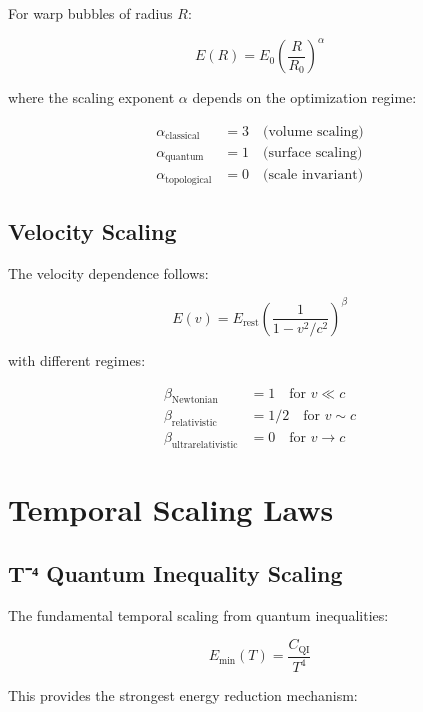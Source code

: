 \documentclass[12pt,a4paper]{article}
\begin{document}
For warp bubbles of radius $R$:

\begin{equation}
E(R) = E_0 \left(\frac{R}{R_0}\right)^\alpha
\end{equation}

where the scaling exponent $\alpha$ depends on the optimization regime:

\begin{align}
\alpha_{\text{classical}} &= 3 \quad \text{(volume scaling)} \\
\alpha_{\text{quantum}} &= 1 \quad \text{(surface scaling)} \\
\alpha_{\text{topological}} &= 0 \quad \text{(scale invariant)}
\end{align}

\subsection{Velocity Scaling}

The velocity dependence follows:

\begin{equation}
E(v) = E_{\text{rest}} \left(\frac{1}{1 - v^2/c^2}\right)^\beta
\end{equation}

with different regimes:

\begin{align}
\beta_{\text{Newtonian}} &= 1 \quad \text{for } v \ll c \\
\beta_{\text{relativistic}} &= 1/2 \quad \text{for } v \sim c \\
\beta_{\text{ultrarelativistic}} &= 0 \quad \text{for } v \rightarrow c
\end{align}

\section{Temporal Scaling Laws}

\subsection{T⁻⁴ Quantum Inequality Scaling}

The fundamental temporal scaling from quantum inequalities:

\begin{equation}
E_{\text{min}}(T) = \frac{C_{\text{QI}}}{T^4}
\end{equation}

This provides the strongest energy reduction mechanism:
\end{document}
